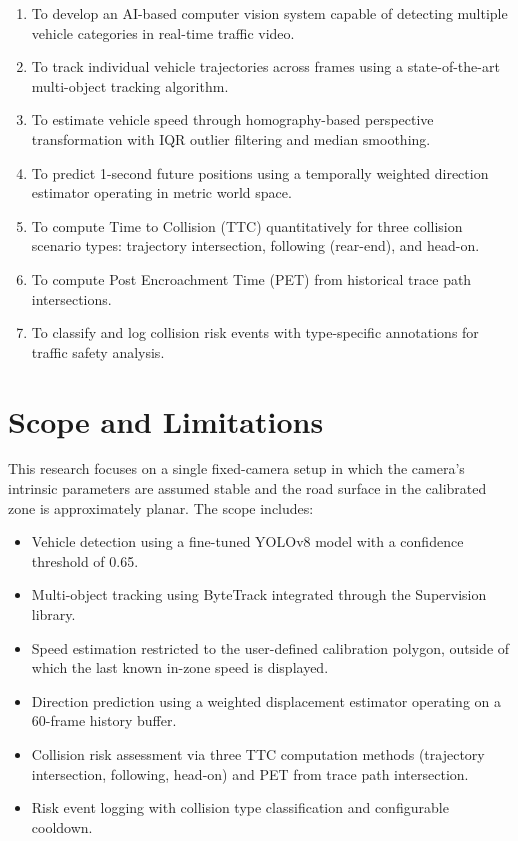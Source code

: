 \documentclass[12pt]{report}
\begin{document}
\begin{enumerate}
    \item To develop an AI-based computer vision system capable of detecting multiple vehicle categories in real-time traffic video.
    \item To track individual vehicle trajectories across frames using a state-of-the-art multi-object tracking algorithm.
    \item To estimate vehicle speed through homography-based perspective transformation with IQR outlier filtering and median smoothing.
    \item To predict 1-second future positions using a temporally weighted direction estimator operating in metric world space.
    \item To compute Time to Collision (TTC) quantitatively for three collision scenario types: trajectory intersection, following (rear-end), and head-on.
    \item To compute Post Encroachment Time (PET) from historical trace path intersections.
    \item To classify and log collision risk events with type-specific annotations for traffic safety analysis.
\end{enumerate}

\section{Scope and Limitations}

This research focuses on a single fixed-camera setup in which the camera's intrinsic parameters are assumed stable and the road surface in the calibrated zone is approximately planar.
The scope includes:

\begin{itemize}
    \item Vehicle detection using a fine-tuned YOLOv8 model with a confidence threshold of 0.65.
    \item Multi-object tracking using ByteTrack integrated through the Supervision library.
    \item Speed estimation restricted to the user-defined calibration polygon, outside of which the last known in-zone speed is displayed.
    \item Direction prediction using a weighted displacement estimator operating on a 60-frame history buffer.
    \item Collision risk assessment via three TTC computation methods (trajectory intersection, following, head-on) and PET from trace path intersection.
    \item Risk event logging with collision type classification and configurable cooldown.
\end{itemize}
\end{document}
